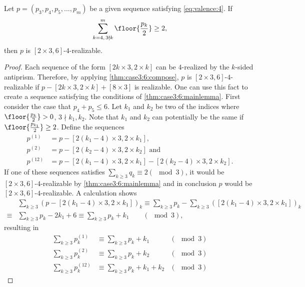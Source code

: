\begin{theorem}
  Let $p = (p_3, p_4, p_5, \dots, p_m)$ be a given sequence satisfying \autoref{eq:valence:4}. If
  \begin{align*}
    \sum_{k=4,\, 3 \nmid k}^m \floor{\frac{p_k}{2}} \geq 2,
  \end{align*}
  then $p$ is $[2 \times 3, 6]$-$4$-realizable.
  \begin{proof}
    Each sequence of the form $[2k \times 3, 2 \times k]$ can be $4$-realized by the $k$-sided antiprism. Therefore, by applying \autoref{thm:case3:6:compose}, $p$ is $[2 \times 3, 6]$-$4$-realizable if $p - [2k \times 3, 2 \times k] + [8 \times 3]$ is realizable. One can use this fact to create a sequence satisfying the conditions of \autoref{thm:case3:6:mainlemma}. First consider the case that $p_4 + p_5 \leq 6$. Let $k_1$ and $k_2$  be two of the indices where $\floor{\frac{p_k}{2}} > 0$, $3 \nmid k_1, k_2$. Note that $k_1$ and $k_2$ can potentially be the same if $\floor{\frac{p_{k_1}}{2}} \geq 2$. Define the sequences 
    \begin{align*}
      p^{(1)} &= p - [2(k_1 - 4) \times 3, 2 \times k_1], \\
      p^{(2)} &= p - [2(k_2 - 4) \times 3, 2 \times k_2] \text{ and } \\
      p^{(12)} &= p - [2(k_1 - 4) \times 3, 2 \times k_1] - [2(k_2 - 4) \times 3, 2 \times k_2].
    \end{align*}
    If one of these sequences satisfies $\sum_{k\geq 3} q_k \equiv 2 (\mod 3)$, it would be $[2 \times 3, 6]$-$4$-realizable by \autoref{thm:case3:6:mainlemma} and in conclusion $p$ would be $[2 \times 3, 6]$-$4$-realizable. A calculation shows
    \begin{align*}
      &\sum_{k\geq 3} (p - [2(k_1 - 4) \times 3, 2 \times k_1])_k  \equiv \sum_{k\geq 3} p_k - \sum_{k\geq 3} ([2(k_1 - 4) \times 3, 2 \times k_1])_k \\
      \equiv& \sum_{k\geq 3} p_k - 2k_1 + 6 \equiv \sum_{k\geq 3} p_k + k_1 \qquad (\mod 3),
    \end{align*}
    resulting in
    \begin{align*}
      \sum_{k\geq 3} p^{(1)}_k  &\equiv \sum_{k\geq 3} p_k + k_1  & (\mod 3) \\
      \sum_{k\geq 3} p^{(2)}_k  &\equiv \sum_{k\geq 3} p_k + k_2  & (\mod 3) \\
      \sum_{k\geq 3} p^{(12)}_k  &\equiv \sum_{k\geq 3} p_k + k_1 + k_2  & (\mod 3)
    \end{align*}

\end{proof}
\end{theorem}
